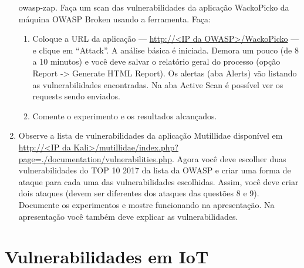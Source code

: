 \documentclass{article}
\begin{document}
\begin{superframe}
\begin{enumerate}
                owasp-zap. Faça um scan das vulnerabilidades da aplicação
                WackoPicko da máquina OWASP Broken usando a ferramenta. Faça:
                \begin{enumerate}
                    \item Coloque a URL da aplicação --- \url{http://<IP da
                        OWASP>/WackoPicko} --- e clique em ``Attack''. A
                        análise básica é iniciada. Demora um pouco (de 8 a 10
                        minutos) e você deve salvar o relatório geral do
                        processo (opção Report -> Generate HTML Report). Os
                        alertas (aba Alerts) vão listando as vulnerabilidades
                        encontradas. Na aba Active Scan é possível ver os
                        requests sendo enviados.
                    \item Comente o experimento e os resultados alcançados.
                \end{enumerate}
            \item Observe a lista de vulnerabilidades da aplicação Mutillidae
                disponível em \url{http://<IP da
                Kali>/mutillidae/index.php?page=./documentation/vulnerabilities.php}.
                Agora você deve escolher duas vulnerabilidades do TOP 10 2017
                da lista da OWASP e criar uma forma de ataque para cada uma das
                vulnerabilidades escolhidas. Assim, você deve criar dois
                ataques (devem ser diferentes dos ataques das questões 8 e 9).
                Documente os experimentos e mostre funcionando na apresentação.
                Na apresentação você também deve explicar as vulnerabilidades.
        \end{enumerate}
    \end{superframe}

    \section{Vulnerabilidades em IoT}
\end{document}
